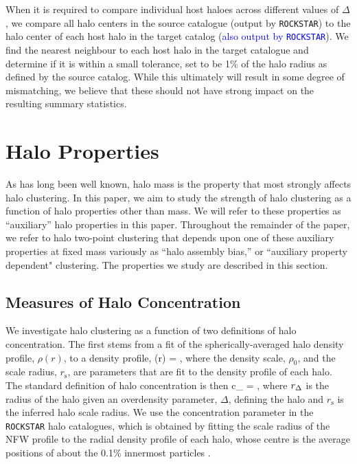 \documentclass[usenatbib,fleqn]{mnras}
\begin{document}
When it is required to compare individual host haloes across different values of $\Delta$, we compare all halo centers in the source catalogue (output by {\tt ROCKSTAR}) to the halo center of each host halo in the target catalog (\textcolor{blue}{also output by {\tt ROCKSTAR}}). We find the nearest neighbour to each host halo in the target catalogue and determine if it is within a small tolerance, set to be 1\% of the halo radius as defined by the source catalog. While this ultimately will result in some degree of mismatching, we believe that these should not have strong impact on the resulting summary statistics.


\section{Halo Properties}
\label{section:haloprops}

As has long been well known, halo mass is the property that most strongly affects halo clustering. In this paper, we aim to study the strength of halo clustering as a function of halo properties other than mass. We will refer to these properties as ``auxiliary'' halo properties in this paper. Throughout the remainder of the paper, we refer to halo two-point clustering that depends upon one of these auxiliary properties at fixed mass variously as ``halo assembly bias,'' or ``auxiliary property dependent" clustering. The properties we study are described in this section.

\subsection{Measures of Halo Concentration}

We investigate halo clustering as a function of two definitions of halo concentration. The first stems from a fit of the spherically-averaged halo density profile, $\rho(r)$, to a \citet[hereafter NFW]{navarro_etal97} density profile, 
%
\beq
\rho(r) = ,
\eeq
%
where the density scale, $\rho_0$, and the scale radius, $r_{\mathrm{s}}$, are parameters that are fit to the density profile of each halo. The standard definition of halo concentration is then 
\beq
c_{} = ,
\eeq
where $r_{\Delta}$ is the radius of the halo given an overdensity parameter, $\Delta$, defining the halo and $r_{\mathrm{s}}$ is the inferred halo scale radius. We use the concentration parameter in the {\tt ROCKSTAR} halo catalogues, which is obtained by fitting the scale radius of the NFW profile to the radial density profile of each halo, whose centre is the average positions of about the 0.1\% innermost particles \citep{behroozi_etal13a}. 
\end{document}
